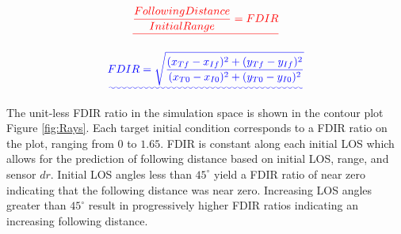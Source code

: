 \documentclass[conference]{IEEEtran}
\providecommand{\DIFadd}[1]{{\protect\color{blue}\uwave{#1}}} %
\providecommand{\DIFdel}[1]{{\protect\color{red}\sout{#1}}}                      %
\providecommand{\DIFaddbegin}{} %
\providecommand{\DIFaddend}{} %
\providecommand{\DIFdelbegin}{} %
\providecommand{\DIFdelend}{} %
\newcommand{\DIFscaledelfig}{0.5}
\newlength{\DIFdelgraphicswidth} %
\newlength{\DIFdelgraphicsheight} %
\newcommand{\DIFaddincludegraphics}[2][]{{\color{blue}\fbox{\DIFOincludegraphics[#1]{#2}}}} %
\newcommand{\DIFdelincludegraphics}[2][]{%
\sbox{\DIFdelgraphicsbox}{\DIFOincludegraphics[#1]{#2}}%
\settoboxwidth{\DIFdelgraphicswidth}{\DIFdelgraphicsbox} %
\settoboxtotalheight{\DIFdelgraphicsheight}{\DIFdelgraphicsbox} %
\scalebox{\DIFscaledelfig}{%
\parbox[b]{\DIFdelgraphicswidth}{\usebox{\DIFdelgraphicsbox}\\[-\baselineskip] \rule{\DIFdelgraphicswidth}{0em}}\llap{\resizebox{\DIFdelgraphicswidth}{\DIFdelgraphicsheight}{%
\setlength{\unitlength}{\DIFdelgraphicswidth}%
\begin{picture}(1,1)%
\thicklines\linethickness{2pt} %
{\color[rgb]{1,0,0}\put(0,0){\framebox(1,1){}}}%
{\color[rgb]{1,0,0}\put(0,0){\line( 1,1){1}}}%
{\color[rgb]{1,0,0}\put(0,1){\line(1,-1){1}}}%
\end{picture}%
}\hspace*{3pt}}} %
} %
\DeclareRobustCommand{\DIFaddbegin}{\DIFOaddbegin \let\includegraphics\DIFaddincludegraphics} %
\DeclareRobustCommand{\DIFaddend}{\DIFOaddend \let\includegraphics\DIFOincludegraphics} %
\DeclareRobustCommand{\DIFdelbegin}{\DIFOdelbegin \let\includegraphics\DIFdelincludegraphics} %
\DeclareRobustCommand{\DIFdelend}{\DIFOaddend \let\includegraphics\DIFOincludegraphics} %
\begin{document}



\DIFdelbegin \begin{displaymath} 
\DIFdel{%
\frac{Following Distance}{Initial Range} = FDIR
}\end{displaymath}
\DIFdelend %

\DIFaddbegin \begin{equation} 
\DIFadd{\label{eq:FDIR}
FDIR = \sqrt{\frac{(x_{Tf}-x_{If})^2+(y_{Tf}-y_{If})^2}{(x_{T0}-x_{I0})^2+(y_{T0}-y_{I0})^2}}
}\end{equation}

\DIFaddend The unit-less FDIR ratio in the simulation space is shown in the contour plot Figure \ref{fig:Rays}. Each target initial condition corresponds to a FDIR ratio on the plot, ranging from $0$ to $1.65$. FDIR is constant along each initial LOS which allows for the prediction of following distance based on initial LOS, range, and sensor $dr$. Initial LOS angles less than $45^{\circ}$ yield a FDIR ratio of near zero indicating that the following distance was near zero. Increasing LOS angles greater than $45^{\circ}$ result in progressively higher FDIR ratios indicating an increasing following distance.
\end{document}
